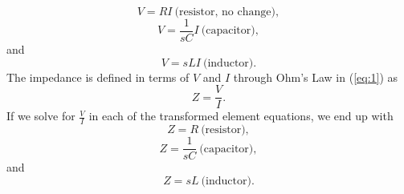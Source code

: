\documentclass[12pt]{report}
\begin{document}
\begin{equation}
\label{eq:7}
V = R I ~\text{(resistor, no change)},
\end{equation}
\begin{equation}
\label{eq:8}
V = \frac{1}{s C} I ~\text{(capacitor)},
\end{equation}
and
\begin{equation}
\label{eq:9}
V = s L I ~\text{(inductor)}.
\end{equation}
The impedance is defined in terms of $V$ and $I$ through Ohm's Law in (\ref{eq:1}) as
\begin{equation}
\label{eq:10}
Z = \frac{V}{I}.
\end{equation}
If we solve for $\frac{V}{I}$ in each of the transformed element equations, we end up with
\begin{equation}
\label{eq:11}
Z = R ~\text{(resistor)},
\end{equation}
\begin{equation}
\label{eq:12}
Z = \frac{1}{s C} ~\text{(capacitor)},
\end{equation}
and
\begin{equation}
\label{eq:13}
Z = s L ~\text{(inductor)}.
\end{equation}
\end{document}
